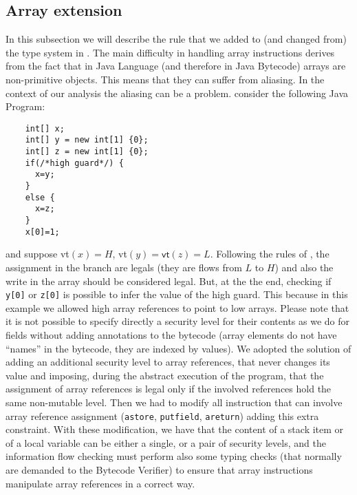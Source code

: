 \documentclass [a4paper,twoside]{article}
\begin{document}
\subsection{Array extension}\label{sec:array}
In this subsection we will describe the rule that we added to (and
changed from) the type system in \cite{BartheRezk}.  The main
difficulty in handling array instructions derives from the fact that
in Java Language (and therefore in Java Bytecode) arrays are
non-primitive objects. This means that they can suffer from aliasing.
In the context of our analysis the aliasing can be a problem. consider the following Java Program:
\begin{center}
  \begin{lstlisting}
    int[] x; 
    int[] y = new int[1] {0}; 
    int[] z = new int[1] {0}; 
    if(/*high guard*/) { 
      x=y; 
    }
    else { 
      x=z; 
    } 
    x[0]=1;
\end{lstlisting}
\end{center}
and suppose \textsf{vt}$(x)=H$, \textsf{vt}$(y)=\mathsf{vt}(z)=L$.
Following the rules of \cite{BartheRezk}, the assignment in the branch
are legals (they are flows from $L$ to $H$) and also the write in the
array should be considered legal. But, at the the end, checking if
\texttt{y[0]} or \texttt{z[0]} is possible to infer the value of the
high guard. This because in this example we allowed high array
references to point to low arrays. Please note that it is not possible
to specify directly a security level for their contents as we do for
fields without adding annotations to the bytecode (array elements do
not have ``names'' in the bytecode, they are indexed by values). We
adopted the solution of adding an additional security level to array
references, that never changes its value and imposing, during the
abstract execution of the program, that the assignment of array
references is legal only if the involved references hold the same
non-mutable level. Then we had to modify all instruction that can
involve array reference assignment (\texttt{astore},
\texttt{putfield}, \texttt{areturn}) adding this extra constraint.
With these modification, we have that the content of a stack item or
of a local variable can be either a single, or a pair of security
levels, and the information flow checking must perform also some
typing checks (that normally are demanded to the Bytecode Verifier) to
ensure that array instructions manipulate array references in a
correct way.



\end{document}
